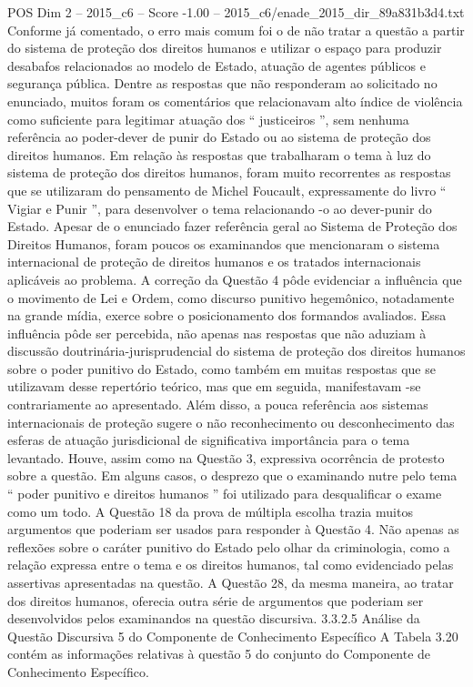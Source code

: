 \begin{textsample}{POS Dim 2 – 2015\_c6 – Score -1.00 – 2015\_c6/enade\_2015\_dir\_89a831b3d4.txt}
Conforme já comentado, o erro mais comum foi o de não tratar a questão a partir do sistema de proteção dos direitos humanos e utilizar o espaço para produzir desabafos relacionados ao modelo de Estado, atuação de agentes públicos e segurança pública.
Dentre as respostas que não responderam ao solicitado no enunciado, muitos foram os comentários que relacionavam alto índice de violência como suficiente para legitimar atuação dos “ justiceiros ”, sem nenhuma referência ao poder-dever de punir do Estado ou ao sistema de proteção dos direitos humanos.
Em relação às respostas que trabalharam o tema à luz do sistema de proteção dos direitos humanos, foram muito recorrentes as respostas que se utilizaram do pensamento de Michel Foucault, expressamente do livro “ Vigiar e Punir ”, para desenvolver o tema relacionando -o ao dever-punir do Estado.
Apesar de o enunciado fazer referência geral ao Sistema de Proteção dos Direitos Humanos, foram poucos os examinandos que mencionaram o sistema internacional de proteção de direitos humanos e os tratados internacionais aplicáveis ao problema.
A correção da Questão 4 pôde evidenciar a influência que o movimento de Lei e Ordem, como discurso punitivo hegemônico, notadamente na grande mídia, exerce sobre o posicionamento dos formandos avaliados.
Essa influência pôde ser percebida, não apenas nas respostas que não aduziam à discussão doutrinária-jurisprudencial do sistema de proteção dos direitos humanos sobre o poder punitivo do Estado, como também em muitas respostas que se utilizavam desse repertório teórico, mas que em seguida, manifestavam -se contrariamente ao apresentado.
Além disso, a pouca referência aos sistemas internacionais de proteção sugere o não reconhecimento ou desconhecimento das esferas de atuação jurisdicional de significativa importância para o tema levantado.
Houve, assim como na Questão 3, expressiva ocorrência de protesto sobre a questão.
Em alguns casos, o desprezo que o examinando nutre pelo tema “ poder punitivo e direitos humanos ” foi utilizado para desqualificar o exame como um todo.
A Questão 18 da prova de múltipla escolha trazia muitos argumentos que poderiam ser usados para responder à Questão 4.
Não apenas as reflexões sobre o caráter punitivo do Estado pelo olhar da criminologia, como a relação expressa entre o tema e os direitos humanos, tal como evidenciado pelas assertivas apresentadas na questão.
A Questão 28, da mesma maneira, ao tratar dos direitos humanos, oferecia outra série de argumentos que poderiam ser desenvolvidos pelos examinandos na questão discursiva. 3.3.2.5 Análise da Questão Discursiva 5 do Componente de Conhecimento Específico A Tabela 3.20 contém as informações relativas à questão 5 do conjunto do Componente de Conhecimento Específico.

\end{textsample}
